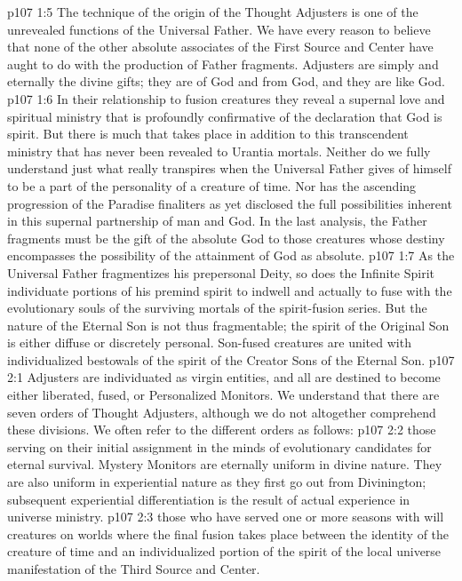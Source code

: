 \vs p107 1:5 The technique of the origin of the Thought Adjusters is one of the unrevealed functions of the Universal Father. We have every reason to believe that none of the other absolute associates of the First Source and Center have aught to do with the production of Father fragments. Adjusters are simply and eternally the divine gifts; they are of God and from God, and they are like God.
\vs p107 1:6 In their relationship to fusion creatures they reveal a supernal love and spiritual ministry that is profoundly confirmative of the declaration that God is spirit. But there is much that takes place in addition to this transcendent ministry that has never been revealed to Urantia mortals. Neither do we fully understand just what really transpires when the Universal Father gives of himself to be a part of the personality of a creature of time. Nor has the ascending progression of the Paradise finaliters as yet disclosed the full possibilities inherent in this supernal partnership of man and God. In the last analysis, the Father fragments must be the gift of the absolute God to those creatures whose destiny encompasses the possibility of the attainment of God as absolute.
\pc \vs p107 1:7 As the Universal Father fragmentizes his prepersonal Deity, so does the Infinite Spirit individuate portions of his premind spirit to indwell and actually to fuse with the evolutionary souls of the surviving mortals of the spirit\hyp{}fusion series. But the nature of the Eternal Son is not thus fragmentable; the spirit of the Original Son is either diffuse or discretely personal. Son\hyp{}fused creatures are united with individualized bestowals of the spirit of the Creator Sons of the Eternal Son.
\vs p107 2:1 Adjusters are individuated as virgin entities, and all are destined to become either liberated, fused, or Personalized Monitors. We understand that there are seven orders of Thought Adjusters, although we do not altogether comprehend these divisions. We often refer to the different orders as follows:
\pc \vs p107 2:2 \bibnobreakspace {} those serving on their initial assignment in the minds of evolutionary candidates for eternal survival. Mystery Monitors are eternally uniform in divine nature. They are also uniform in experiential nature as they first go out from Divinington; subsequent experiential differentiation is the result of actual experience in universe ministry.\plusone
\pc \vs p107 2:3 \bibnobreakspace {} those who have served one or more seasons with will creatures on worlds where the final fusion takes place between the identity of the creature of time and an individualized portion of the spirit of the local universe manifestation of the Third Source and Center.
